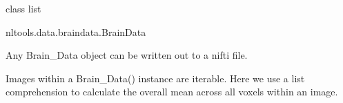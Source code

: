 \documentclass[letterpaper,10pt,english]{sphinxmanual}
\begin{document}
\begin{sphinxVerbatim}[commandchars=\\\{\}]
\PYG{p}{[}    \PYG{p}{[}\PYG{p}{]}\PYG{p}{]}

\PYG{p}{[}    \PYG{p}{[}\PYG{p}{]}\PYG{p}{]}
\end{sphinxVerbatim}

\begin{sphinxVerbatim}[commandchars=\\\{\}]
\PYGZlt{}class \PYGZsq{}list\PYGZsq{}\PYGZgt{}
\end{sphinxVerbatim}

\begin{sphinxVerbatim}[commandchars=\\\{\}]
nltools.data.brain\PYGZus{}data.Brain\PYGZus{}Data
\end{sphinxVerbatim}

Any Brain\_Data object can be written out to a nifti file.

\begin{sphinxVerbatim}[commandchars=\\\{\}]
\end{sphinxVerbatim}

Images within a Brain\_Data() instance are iterable.  Here we use a list comprehension to calculate the overall mean across all voxels within an image.

\begin{sphinxVerbatim}[commandchars=\\\{\}]
\PYG{p}{[}    \PYG{p}{]}
\end{sphinxVerbatim}
\end{document}

